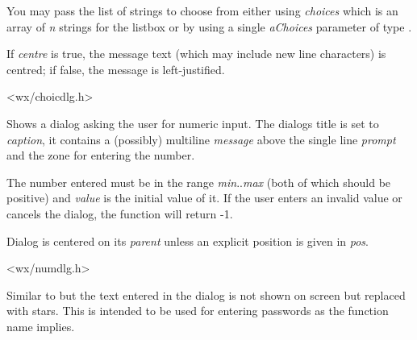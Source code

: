 You may pass the list of strings to choose from either using {\it choices}
which is an array of {\it n} strings for the listbox or by using a single
{\it aChoices} parameter of type .

If {\it centre} is true, the message text (which may include new line
characters) is centred; if false, the message is left-justified.


<wx/choicdlg.h>



\label{wxgetnumberfromuser}


Shows a dialog asking the user for numeric input. The dialogs title is set to
{\it caption}, it contains a (possibly) multiline {\it message} above the
single line {\it prompt} and the zone for entering the number.

The number entered must be in the range {\it min}..{\it max} (both of which
should be positive) and {\it value} is the initial value of it. If the user
enters an invalid value or cancels the dialog, the function will return -1.

Dialog is centered on its {\it parent} unless an explicit position is given in
{\it pos}.


<wx/numdlg.h>


\label{wxgetpasswordfromuser}


Similar to  but the text entered
in the dialog is not shown on screen but replaced with stars. This is intended
to be used for entering passwords as the function name implies.

